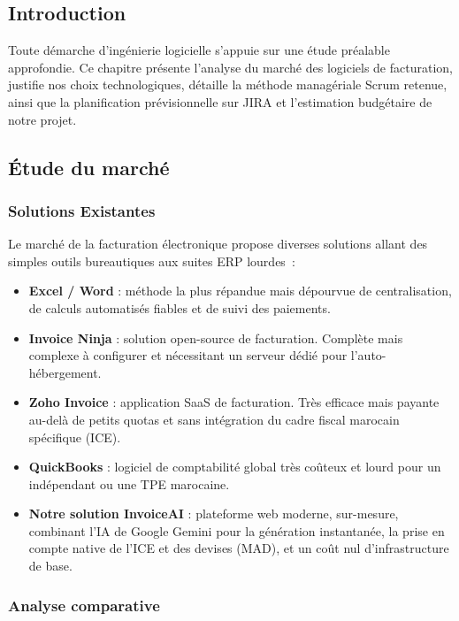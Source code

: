 \documentclass[a4paper,12pt]{extarticle}
\begin{document}
\subsection*{Introduction}
{}

Toute démarche d'ingénierie logicielle s'appuie sur une étude préalable approfondie. Ce chapitre présente l'analyse du marché des logiciels de facturation, justifie nos choix technologiques, détaille la méthode managériale Scrum retenue, ainsi que la planification prévisionnelle sur JIRA et l'estimation budgétaire de notre projet.

\subsection{Étude du marché}

\subsubsection{Solutions Existantes}

Le marché de la facturation électronique propose diverses solutions allant des simples outils bureautiques aux suites ERP lourdes~:

\begin{itemize}
  \item \textbf{Excel / Word} : méthode la plus répandue mais dépourvue de centralisation, de calculs automatisés fiables et de suivi des paiements.
  \item \textbf{Invoice Ninja} : solution open-source de facturation. Complète mais complexe à configurer et nécessitant un serveur dédié pour l'auto-hébergement.
  \item \textbf{Zoho Invoice} : application SaaS de facturation. Très efficace mais payante au-delà de petits quotas et sans intégration du cadre fiscal marocain spécifique (ICE).
  \item \textbf{QuickBooks} : logiciel de comptabilité global très coûteux et lourd pour un indépendant ou une TPE marocaine.
  \item \textbf{Notre solution InvoiceAI} : plateforme web moderne, sur-mesure, combinant l'IA de Google Gemini pour la génération instantanée, la prise en compte native de l'ICE et des devises (MAD), et un coût nul d'infrastructure de base.
\end{itemize}

\subsubsection{Analyse comparative}
\end{document}
